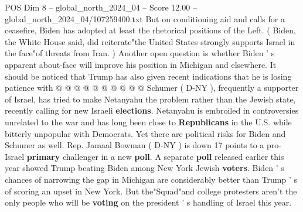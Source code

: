 \begin{textsample}{POS Dim 8 – global\_north\_2024\_04 – Score 12.00 – global\_north\_2024\_04/107259400.txt}
But on conditioning aid and calls for a ceasefire, Biden has adopted at least the rhetorical positions of the Left. ( Biden, the White House said, did reiterate"the United States strongly supports Israel in the face"of threats from Iran. ) Another open question is whether Biden ' s apparent about-face will improve his position in Michigan and elsewhere.
It should be noticed that Trump has also given recent indications that he is losing patience with @ @ @ @ @ @ @ @ @ @ Schumer ( D-NY ), frequently a supporter of Israel, has tried to make Netanyahu the problem rather than the Jewish state, recently calling for new Israeli \textbf{elections}.
Netanyahu is embroiled in controversies unrelated to the war and has long been close to \textbf{Republicans} in the U.S. while bitterly unpopular with Democrats.
Yet there are political risks for Biden and Schumer as well.
Rep.
Jamaal Bowman ( D-NY ) is down 17 points to a pro-Israel \textbf{primary} challenger in a new \textbf{poll}.
A separate \textbf{poll} released earlier this year showed Trump beating Biden among New York Jewish \textbf{voters}.
Biden ' s chances of narrowing the gap in Michigan are considerably better than Trump ' s of scoring an upset in New York.
But the"Squad"and college protesters aren't the only people who will be \textbf{voting} on the president ' s handling of Israel this year.

\end{textsample}
